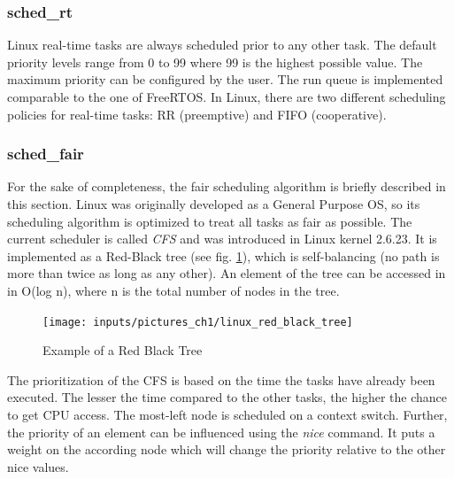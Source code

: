 \subsubsection{sched\_rt} 
Linux real-time tasks are always scheduled prior to any other task. 
The default priority levels range from 0 to 99 where 99 is the highest possible value.
The maximum priority can be configured by the user. 
The run queue is implemented comparable to the one of FreeRTOS. 
In Linux, there are two different scheduling policies for real-time tasks: \ac{RR} (preemptive) and \ac{FIFO} (cooperative).

\subsubsection{sched\_fair}
For the sake of completeness, the fair scheduling algorithm is briefly described in this section.
Linux was originally developed as a General Purpose \ac{OS}, so its scheduling algorithm is optimized to treat all tasks as fair as possible. 
The current scheduler is called \textit{\ac{CFS}} and was introduced in Linux kernel 2.6.23.
It is implemented as a Red-Black tree (see fig. \ref{fig_linux_red_black_tree}), which is self-balancing (no path is more than twice as long as any other).
An element of the tree can be accessed in in O(log n), where n is the total number of nodes in the tree.
\begin{figure}[htb]
	\begin{center}
		\texttt{[image: inputs/pictures\_ch1/linux\_red\_black\_tree]}
	\end{center}
	\caption[Example of a Red Black Tree]{Example of a Red Black Tree \cite{jones:itlcfss}} \label{fig_linux_red_black_tree}
\end{figure}
The prioritization of the \ac{CFS} is based on the time the tasks have already been executed. 
The lesser the time compared to the other tasks, the higher the chance to get \ac{CPU} access.
The most-left node is scheduled on a context switch.
Further, the priority of an element can be influenced using the \textit{nice} command. 
It puts a weight on the according node which will change the priority relative to the other nice values.

